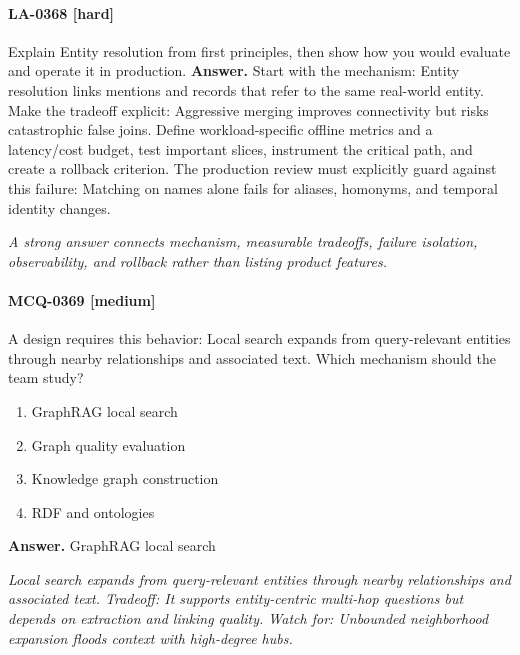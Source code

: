 \paragraph{LA-0368 [hard]} Explain Entity resolution from first principles, then show how you would evaluate and operate it in production.
\noindent\textbf{Answer.} Start with the mechanism: Entity resolution links mentions and records that refer to the same real-world entity. Make the tradeoff explicit: Aggressive merging improves connectivity but risks catastrophic false joins. Define workload-specific offline metrics and a latency/cost budget, test important slices, instrument the critical path, and create a rollback criterion. The production review must explicitly guard against this failure: Matching on names alone fails for aliases, homonyms, and temporal identity changes.
\par\textit{A strong answer connects mechanism, measurable tradeoffs, failure isolation, observability, and rollback rather than listing product features.}
\paragraph{MCQ-0369 [medium]} A design requires this behavior: Local search expands from query-relevant entities through nearby relationships and associated text. Which mechanism should the team study?
\begin{enumerate}[label=\Alph*.]
\item GraphRAG local search
\item Graph quality evaluation
\item Knowledge graph construction
\item RDF and ontologies
\end{enumerate}
\noindent\textbf{Answer.} GraphRAG local search
\par\textit{Local search expands from query-relevant entities through nearby relationships and associated text. Tradeoff: It supports entity-centric multi-hop questions but depends on extraction and linking quality. Watch for: Unbounded neighborhood expansion floods context with high-degree hubs.}
